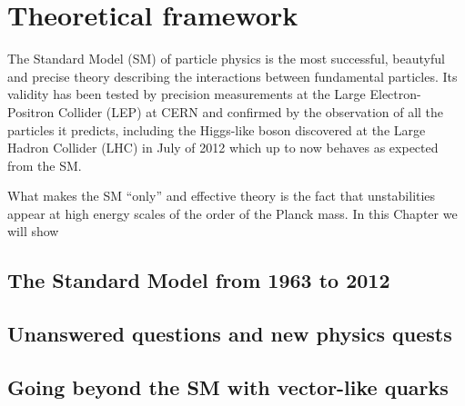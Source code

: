 \clearpage{\pagestyle{empty}\cleardoublepage}

\chapter{Theoretical framework}\label{chap:TH}

The Standard Model (SM) of particle physics is the most successful, beautyful and precise theory describing the interactions
between fundamental particles. Its validity has been tested by precision measurements at the Large Electron-Positron Collider (LEP)
at CERN and confirmed by the observation of all the particles it predicts, including the Higgs-like boson discovered at the
Large Hadron Collider (LHC) in July of 2012 which up to now behaves as expected from the SM.

What makes the SM ``only'' and effective theory is the fact that unstabilities appear at high energy scales of the order of the
Planck mass. In this Chapter we will show 

\section{The Standard Model from 1963 to 2012}\label{sec:THsm}

\section{Unanswered questions and new physics quests}\label{sec:THquest}

\section{Going beyond the SM with vector-like quarks}\label{sec:THvlq}

\cite{AguilarSaavedra:2009es,Martin:2009bg}
